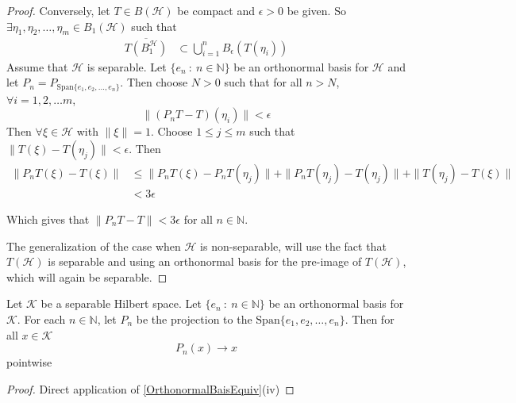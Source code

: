 \begin{proof}
  Conversely, let $T \in B(\mathcal{H})$ be compact and $\epsilon>0$ be given.
  So $\exists \eta_1, \eta_2, \ldots , \eta_m \in B_1(\mathcal{H})$ such that
  \begin{align*}
    \overline{T(B_1^\mathcal{H})} &\subset \bigcup_{i =
    1}^{n}B_\epsilon(T(\eta_i))
  \end{align*}
  Assume that $\mathcal{H}$ is separable. Let $\{ e_n  \ : \  n \in
  \mathbb{N} \}$ be an orthonormal basis for $\mathcal{H}$ and let $P_n =
  P_{\textrm{Span}\{e_1 , e_2 , \ldots , e_n\}}$. Then choose $ N>0$
  such that for all $n >N$, $\forall i = 1, 2, \ldots m$, \[
    \|(P_nT - T)(\eta_i)\| < \epsilon
  \]
  Then $\forall \xi \in \mathcal{H}$ with $\|\xi\| = 1$. Choose $1 \le j \le
  m$ such that $\|T(\xi) - T(\eta_j)\| < \epsilon$. Then
  \begin{align*}
    \|P_nT(\xi) - T(\xi)\| & \le \|P_nT(\xi) - P_nT(\eta_j)\| +
    \|P_nT(\eta_j) - T(\eta_j)\| + \|T(\eta_j) - T(\xi)\| \\
    &< 3\epsilon
  \end{align*}

  Which gives that $\|P_nT - T\| < 3\epsilon$ for all $n \in \mathbb{N}$.

  The generalization of the case when $\mathcal{H}$ is non-separable, will use
  the fact that $T(\mathcal{H})$ is separable and using an orthonormal basis
  for the pre-image of $T(\mathcal{H})$, which will again be separable.
\end{proof}

\begin{proposition}
  Let $\mathcal{K}$ be a separable Hilbert space. Let $\{ e_n \ : \ n \in
  \mathbb{N} \}$ be an orthonormal basis for $\mathcal{K}$.
  For each $n \in
  \mathbb{N}$, let $P_n$ be the projection to the $\textrm{Span}\{
  e_1 , e_2 , \ldots , e_n \}$. Then for all $ x \in \mathcal{K}$ \[
    P_n(x) \to x
  \]
  pointwise
\end{proposition}
\begin{proof}
  Direct application of \autoref{OrthonormalBaisEquiv}(iv)
\end{proof}

